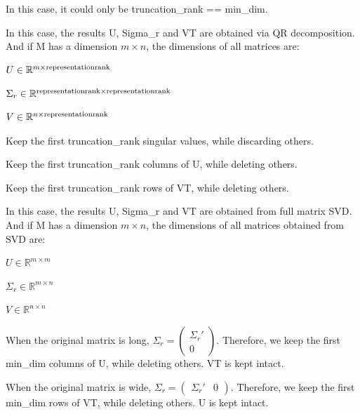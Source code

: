 In this case, it could only be {\ttfamily truncation\+\_\+rank} == {\ttfamily min\+\_\+dim}.

In this case, the results {\ttfamily U}, {\ttfamily Sigma\+\_\+r} and {\ttfamily VT} are obtained via QR decomposition. And if {\ttfamily M} has a dimension $m \times n$, the dimensions of all matrices are\+:
\begin{DoxyItemize}
\item $U \in \mathbb{R}^{m \times {\rm representation rank}}$
\item $\Sigma_r \in \mathbb{R}^{{\rm representation rank} \times {\rm representation rank}}$
\item $V \in \mathbb{R}^{n \times {\rm representation rank}}$
\end{DoxyItemize}

Keep the first {\ttfamily truncation\+\_\+rank} singular values, while discarding others.

Keep the first {\ttfamily truncation\+\_\+rank} columns of {\ttfamily U}, while deleting others.

Keep the first {\ttfamily truncation\+\_\+rank} rows of {\ttfamily VT}, while deleting others.

In this case, the results {\ttfamily U}, {\ttfamily Sigma\+\_\+r} and {\ttfamily VT} are obtained from full matrix S\+VD. And if {\ttfamily M} has a dimension $m \times n$, the dimensions of all matrices obtained from S\+VD are\+:
\begin{DoxyItemize}
\item $U \in \mathbb{R}^{m \times m}$
\item $\Sigma_r \in \mathbb{R}^{m \times n}$
\item $V \in \mathbb{R}^{n \times n}$
\end{DoxyItemize}

When the original matrix is long, $\Sigma_r = \begin{pmatrix}\Sigma_r' \\ 0 \end{pmatrix}$. Therefore, we keep the first {\ttfamily min\+\_\+dim} columns of {\ttfamily U}, while deleting others. {\ttfamily VT} is kept intact.

When the original matrix is wide, $\Sigma_r = \begin{pmatrix} \Sigma_r' & 0 \end{pmatrix}$. Therefore, we keep the first {\ttfamily min\+\_\+dim} rows of {\ttfamily VT}, while deleting others. {\ttfamily U} is kept intact.


